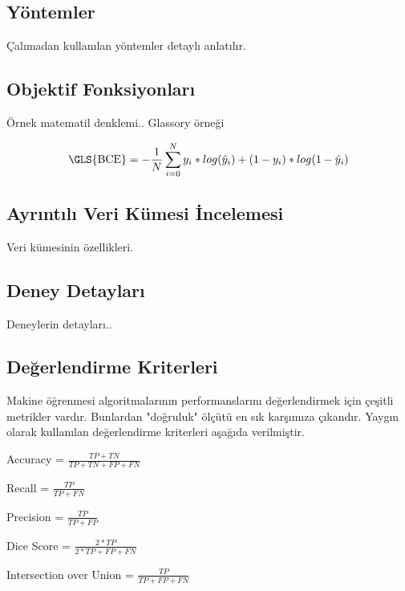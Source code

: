 \documentclass[a4paper, doc, natbib]{apa6}
\begin{document}
\subsection{Yöntemler}
Çalımadan kullanılan yöntemler detaylı anlatılır. 
\subsection{Objektif Fonksiyonları}

Örnek matematil denklemi.. Glassory örneği

\begin{equation}
    \text{\GLS{BCE}} = - \frac{1}{N}\sum_{i=0}^{N} y_i * log(\hat{y}_i) + (1-y_i)*log(1-\hat{y}_i) 
\end{equation}



\subsection{Ayrıntılı Veri Kümesi İncelemesi}
Veri kümesinin özellikleri. 


\subsection{Deney Detayları}
Deneylerin detayları..

\subsection{Değerlendirme Kriterleri}
Makine öğrenmesi algoritmalarının performanslarını değerlendirmek için çeşitli metrikler vardır. Bunlardan "doğruluk" ölçütü en sık karşımıza çıkandır. Yaygın olarak kullanılan değerlendirme kriterleri aşağıda verilmiştir. 

\begin{center}
    Accuracy = $\frac{TP + TN }{ TP + TN + FP + FN}$
\end{center}
\begin{center}
    Recall = $\frac{TP  }{ TP + FN}$
\end{center}
\begin{center}
    Precision = $\frac{TP }{ TP + FP}$
\end{center}
\begin{center}
    Dice Score = $\frac{ 2*TP }{ 2*TP + FP + FN}$
\end{center}
\begin{center}
    Intersection over Union = $\frac{ TP }{ TP + FP + FN}$
\end{center}
\end{document}
